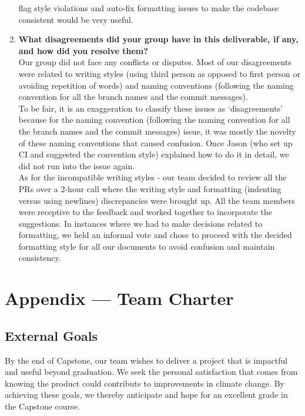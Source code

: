 \documentclass{article}
\begin{document}
\begin{enumerate}
    flag style violations and auto-fix formatting issues to make the codebase consistent would be very useful.
    \item \textbf{What disagreements did your group have in this deliverable, if any,
    and how did you resolve them?}\\
    \newline
    Our group did not face any conflicts or disputes. Most of our disagreements were related to writing styles
    (using third person as opposed to first person or avoiding repetition of words) and naming conventions (following
    the naming convention for all the branch names and the commit messages).\\
    \newline
    To be fair, it is an exaggeration to classify these issues as `disagreements' because for the naming convention (following
    the naming convention for all the branch names and the commit messages) issue, it was mostly the novelty of these naming 
    conventions that caused confusion. Once Jason (who set up CI and suggested the convention style) explained how to do it in 
    detail, we did not run into the issue again.\\
    \newline
    As for the incompatible writing styles -  our team decided to review all the PRs over a 2-hour call where the writing
    style and formatting (indenting versus using newlines) discrepancies were brought up. All the team members were
    receptive to the feedback and worked together to incorporate the suggestions. In instances where we had to make
    decisions related to formatting, we held an informal vote and chose to proceed with the decided formatting style
    for all our documents to avoid confusion and maintain consistency.
\end{enumerate}

\newpage{}

\section*{Appendix --- Team Charter \cite{ref1}}

\subsection*{External Goals}

By the end of Capstone, our team wishes to deliver a project that is impactful
and useful beyond graduation. We seek the personal satisfaction that comes from
knowing the product could contribute to improvements in climate change. By
achieving these goals, we thereby anticipate and hope for an excellent grade in
the Capstone course.
\end{document}
